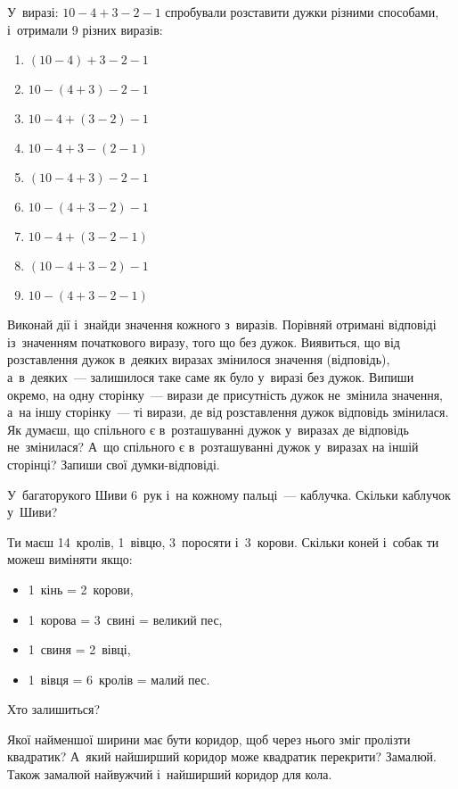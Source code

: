 \problem
{}
У~виразі: $10 - 4 + 3 - 2 - 1$ спробували розставити дужки різними способами,
і~отримали 9 різних виразів:
\begin{multicols}{2}
    \begin{enumerate}
        \item $(10 - 4) + 3 - 2 - 1$
        \item $10 - (4 + 3) - 2 - 1$
        \item $10 - 4 + (3 - 2) - 1$
        \item $10 - 4 + 3 - (2 - 1)$
        \item $(10 - 4 + 3) - 2 - 1$
        \item $10 - (4 + 3 - 2) - 1$
        \item $10 - 4 + (3 - 2 - 1)$
        \item $(10 - 4 + 3 - 2) - 1$
        \item $10 - (4 + 3 - 2 - 1)$
    \end{enumerate}
\end{multicols}
Виконай дії і~знайди значення кожного з~виразів.
Порівняй отримані відповіді із~значенням початкового виразу,
того що без дужок.
Виявиться, що від розставлення дужок в~деяких виразах змінилося
значення (відповідь), а~в~деяких~--- залишилося таке саме
як було у~виразі без дужок.
Випиши окремо, на одну сторінку~--- вирази де присутність дужок
не~змінила значення, а~на іншу сторінку~--- ті вирази,
де від розставлення дужок відповідь змінилася.
Як думаєш, що спільного є в~розташуванні дужок у~виразах
де відповідь не~змінилася?
А~що спільного є в~розташуванні дужок у~виразах на іншій сторінці?
Запиши свої думки-відповіді.


\problem
У~багаторукого Шиви 6~рук і~на кожному пальці~--- каблучка.
Скільки каблучок у~Шиви?


\problem
{}
Ти маєш 14~кролів, 1~вівцю, 3~поросяти і~3~корови.
Скільки коней і~собак ти можеш виміняти якщо:
\begin{itemize}
    \item 1~кінь = 2~корови,
    \item 1~корова = 3~свині = великий пес,
    \item 1~свиня = 2~вівці,
    \item 1~вівця = 6~кролів = малий пес.
\end{itemize}
Хто залишиться?


\problem
{}
Якої найменшої ширини має бути коридор,
щоб через нього зміг пролізти квадратик?
А~який найширший коридор може квадратик перекрити?
Замалюй. Також замалюй найвужчий і~найширший коридор для кола.



